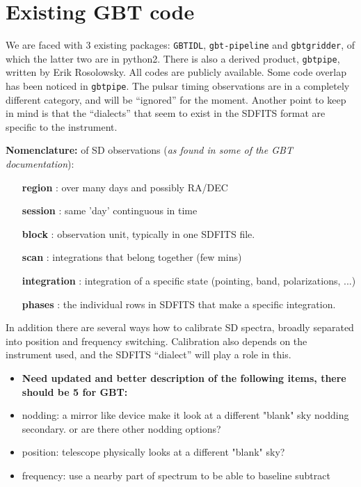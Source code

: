 \documentclass[12pt,a4paper]{article}
\begin{document}
\section{Existing GBT code}

We are faced with 3 existing packages: {\tt GBTIDL}, {\tt gbt-pipeline} and
{\tt gbtgridder}, of which the latter two are in python2. There is also
a derived product, {\tt gbtpipe}, written by Erik Rosolowsky. All codes are
publicly available. Some code overlap has been noticed in {\tt gbtpipe}.
The pulsar timing observations are
in a completely different category, and will be ``ignored'' for the
moment. Another point to keep in mind is that
the ``dialects'' that seem to exist in the SDFITS format are specific to the instrument.

\bigskip\noindent
{\bf Nomenclature:} of SD observations ({\it as found in some of the GBT documentation}):
    

\begin{itemize}[leftmargin=1in]
  \item[{\bf region}]  : over many days and possibly RA/DEC
  \item[{\bf session}] : same 'day' continguous in time
  \item[{\bf block}]   : observation unit, typically in one SDFITS file.
  \item[{\bf scan}]    : integrations that belong together (few mins)
  \item[{\bf integration}] : integration of a specific state (pointing, band, polarizations, ...)
  \item[{\bf phases}]    : the individual rows in SDFITS that make a specific integration. 
\end{itemize}   


In addition there are several ways how to calibrate SD spectra, broadly separated
into position and frequency switching. Calibration also depends on the instrument used,
and the SDFITS ``dialect'' will play a role in this.

\begin{itemize}
\item
  {\bf Need updated and better description of the following items, there should be 5 for GBT:}
\item
nodding:    a mirror like device make it look at a different "blank" sky
nodding secondary. or are there other nodding options?
\item
position:   telescope physically looks at a different "blank" sky?
\item
frequency:  use a nearby part of spectrum to be able to baseline subtract
\end{itemize}
\end{document}
